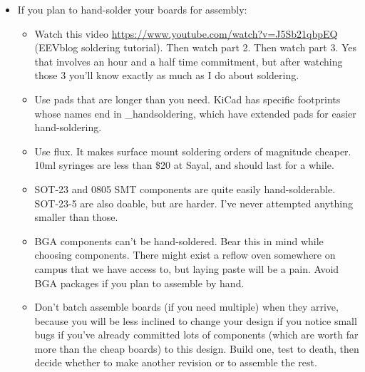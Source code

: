 \documentclass{article}
\begin{document}
\begin{itemize}
\item If you plan to hand-solder your boards for assembly:
\begin{itemize}
\item Watch this video \url{https://www.youtube.com/watch?v=J5Sb21qbpEQ} (EEVblog soldering tutorial). Then watch part 2. Then watch part 3. Yes that involves an hour and a half time commitment, but after watching those 3 you'll know exactly as much as I do about soldering.
\item Use pads that are longer than you need. KiCad has specific footprints whose names end in \_handsoldering, which have extended pads for easier hand-soldering.
\item Use flux. It makes surface mount soldering orders of magnitude cheaper. 10ml syringes are less than \$20 at Sayal, and should last for a while.
\item SOT-23 and 0805 SMT components are quite easily hand-solderable. SOT-23-5 are also doable, but are harder. I've never attempted anything smaller than those.
\item BGA components can't be hand-soldered. Bear this in mind while choosing components. There might exist a reflow oven somewhere on campus that we have access to, but laying paste will be a pain. Avoid BGA packages if you plan to assemble by hand.
\item Don't batch assemble boards (if you need multiple) when they arrive, because you will be less inclined to change your design if you notice small bugs if you've already committed lots of components (which are worth far more than the cheap boards) to this design. Build one, test to death, then decide whether to make another revision or to assemble the rest.
\end{itemize}
\end{itemize}

\end{document}

